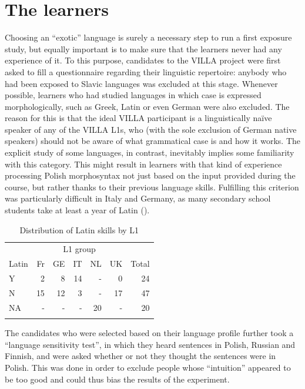 \section{The learners}\label{sec:02:3}

Choosing an “exotic” language is surely a necessary step to run a first exposure study, but equally important is to make sure that the learners never had any experience of it. To this purpose, candidates to the VILLA project were first asked to fill a questionnaire regarding their linguistic repertoire: anybody who had been exposed to Slavic languages was excluded at this stage. Whenever possible, learners who had studied languages in which case is expressed morphologically, such as Greek, Latin or even German were also excluded. The reason for this is that the ideal VILLA participant is a linguistically naïve speaker of any of the VILLA L1s, who (with the sole exclusion of German native speakers) should not be aware of what grammatical case is and how it works. The explicit study of some languages, in contrast, inevitably implies some familiarity with this category. This might result in learners with that kind of experience processing Polish morphosyntax not just based on the input provided during the course, but rather thanks to their previous language skills. Fulfilling this criterion was particularly difficult in Italy and Germany, as many secondary school students take at least a year of Latin (). 

\begin{table}
    \begin{tabularx}{.66\textwidth}{Xrrrrrr}
    \lsptoprule
         & \multicolumn{5}{c}{L1 group} & \\
        Latin & Fr & GE & IT & NL & UK & Total\\
    \midrule
        Y & 2 & 8 & 14 & {}- & 0 & 24\\
        N & 15 & 12 & 3 & {}- & 17 & 47\\
        NA & {}- & {}- & {}- & 20 & {}- & 20\\
    \lspbottomrule
    \end{tabularx}
    \caption{Distribution of Latin skills by L1}
    \label{tab:02:7}
\end{table}

The candidates who were selected based on their language profile further took a “language sensitivity test”, in which they heard sentences in Polish, Russian and Finnish, and were asked whether or not they thought the sentences were in Polish. This was done in order to exclude people whose “intuition” appeared to be too good and could thus bias the results of the experiment.

